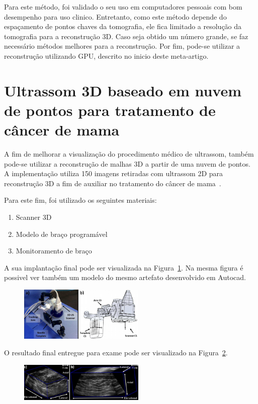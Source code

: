 \documentclass[letterpaper, 10 pt, conference]{ieeeconf}
\begin{document}
Para este método, foi validado o seu uso em computadores pessoais com bom desempenho para uso clinico.
%
Entretanto, como este método depende do espaçamento de pontos chaves da tomografia, ele fica limitado a resolução da tomografia para a reconstrução 3D.
%
Caso seja obtido um número grande, se faz necessário métodos melhores para a reconstrução.
%
Por fim, pode-se utilizar a reconstrução utilizando GPU, descrito no inicio deste meta-artigo.

\section{Ultrassom 3D baseado em nuvem de pontos para tratamento de câncer de mama}

A fim de melhorar a visualização do procedimento médico de ultrassom, também pode-se utilizar a reconstrução de malhas 3D a partir de uma nuvem de pontos.
%
A implementação utiliza 150 imagens retiradas com ultrassom 2D para reconstrução 3D a fim de auxiliar no tratamento do câncer de mama~\cite{Michael2018May}.

Para este fim, foi utilizado os seguintes materiais:

\begin{enumerate}
  \item Scanner 3D
  \item Modelo de braço programável
  \item Monitoramento de braço
\end{enumerate}

A sua implantação final pode ser visualizada na Figura~\ref{fig:implantacao}.
%
Na mesma figura é possivel ver também um modelo do mesmo artefato desenvolvido em Autocad.

\begin{figure}[htb]
\label{fig:implantacao}
\includegraphics[width=6cm]{./img/implantacao.png}
\centering
\end{figure}

O resultado final entregue para exame pode ser visualizado na Figura~\ref{fig:scanner3d_final}.

\begin{figure}[htb]
\label{fig:scanner3d_final}
\includegraphics[width=6cm]{./img/scanner3d_final.png}
\centering
\end{figure}
\end{document}
